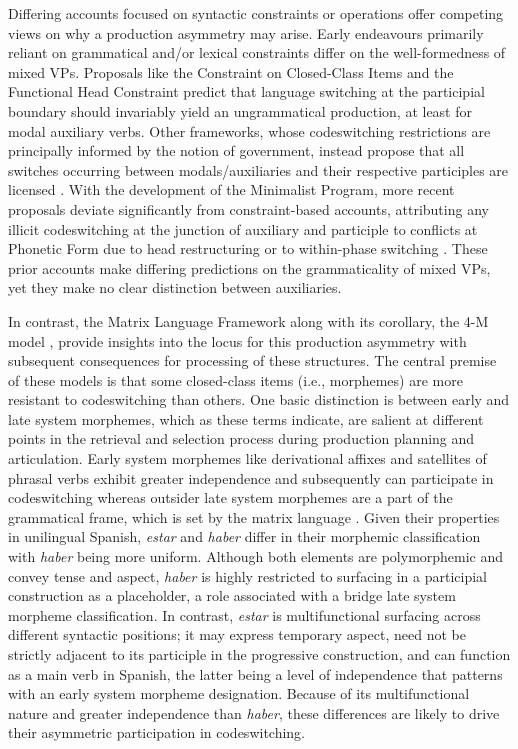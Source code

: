 \documentclass[output=paper,colorlinks,citecolor=brown]{langscibook}
\begin{document}
Differing accounts focused on syntactic constraints or operations offer competing views on why a production asymmetry may arise. Early endeavours primarily reliant on grammatical and/or lexical constraints differ on the well-formedness of mixed VPs. Proposals like the Constraint on Closed-Class Items \citep{Joshi1985} and the Functional Head Constraint \citep{Belazietal1994} predict that language switching at the participial boundary should invariably yield an ungrammatical production, at least for modal auxiliary verbs. Other frameworks, whose codeswitching restrictions are principally informed by the notion of government, instead propose that all switches occurring between modals/auxiliaries and their respective participles are licensed \citep{DiSciulloetal1986}. With the development of the Minimalist Program, more recent proposals deviate significantly from constraint-based accounts, attributing any illicit codeswitching at the junction of auxiliary and participle to conflicts at Phonetic Form due to head restructuring \citep{MacSwan2005,MacSwan2014} or to within-phase switching \citep{Lopezetal2017}. These prior accounts make differing predictions on the grammaticality of mixed VPs, yet they make no clear distinction between auxiliaries.

In contrast, the Matrix Language Framework along with its corollary, the 4-M model \citep{Myers-ScottonJake2017}, provide insights into the locus for this production asymmetry with subsequent consequences for processing of these structures. The central premise of these models is that some closed-class items (i.e., morphemes) are more resistant to codeswitching than others. One basic distinction is between early and late system morphemes, which as these terms indicate, are salient at different points in the retrieval and selection process during production planning and articulation. Early system morphemes like derivational affixes and satellites of phrasal verbs exhibit greater independence and subsequently can participate in codeswitching whereas outsider late system morphemes are a part of the grammatical frame, which is set by the matrix language \citep{Myers-Scotton1993,Myers-ScottonJake2001}. Given their properties in unilingual Spanish, \textit{estar} and \textit{haber} differ in their morphemic classification with \textit{haber} being more uniform. Although both elements are polymorphemic and convey tense and aspect, \textit{haber} is highly restricted to surfacing in a participial construction as a placeholder, a role associated with a bridge late system morpheme classification. In contrast, \textit{estar} is multifunctional surfacing across different syntactic positions; it may express temporary aspect, need not be strictly adjacent to its participle in the progressive construction, and can function as a main verb in Spanish, the latter being a level of independence that patterns with an early system morpheme designation. Because of its multifunctional nature and greater independence than \textit{haber}, these differences are likely to drive their asymmetric participation in codeswitching.
\end{document}

